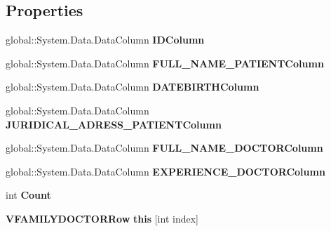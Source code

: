 \subsection*{Properties}
\begin{CompactItemize}
\item 
global::System.Data.DataColumn \textbf{IDColumn}\hspace{0.3cm}{\tt  [get]}\label{class_automatic_medical_system_1_1_data_set1_1_1_v_f_a_m_i_l_y_d_o_c_t_o_r_data_table_fc5576a060b3bf22802ffce4da0617c3}

\item 
global::System.Data.DataColumn \textbf{FULL\_\-NAME\_\-PATIENTColumn}\hspace{0.3cm}{\tt  [get]}\label{class_automatic_medical_system_1_1_data_set1_1_1_v_f_a_m_i_l_y_d_o_c_t_o_r_data_table_562c80571c9b0093932f308bca959298}

\item 
global::System.Data.DataColumn \textbf{DATEBIRTHColumn}\hspace{0.3cm}{\tt  [get]}\label{class_automatic_medical_system_1_1_data_set1_1_1_v_f_a_m_i_l_y_d_o_c_t_o_r_data_table_d2ca1ecfe462dd115a8959b508431de4}

\item 
global::System.Data.DataColumn \textbf{JURIDICAL\_\-ADRESS\_\-PATIENTColumn}\hspace{0.3cm}{\tt  [get]}\label{class_automatic_medical_system_1_1_data_set1_1_1_v_f_a_m_i_l_y_d_o_c_t_o_r_data_table_2ebad28baa533b7176bfff50dcc19cf3}

\item 
global::System.Data.DataColumn \textbf{FULL\_\-NAME\_\-DOCTORColumn}\hspace{0.3cm}{\tt  [get]}\label{class_automatic_medical_system_1_1_data_set1_1_1_v_f_a_m_i_l_y_d_o_c_t_o_r_data_table_d8678056b5612e3405f4f08bed782ac2}

\item 
global::System.Data.DataColumn \textbf{EXPERIENCE\_\-DOCTORColumn}\hspace{0.3cm}{\tt  [get]}\label{class_automatic_medical_system_1_1_data_set1_1_1_v_f_a_m_i_l_y_d_o_c_t_o_r_data_table_8f0d07a454f7ff7e6bc5aa3f3b057d41}

\item 
int \textbf{Count}\hspace{0.3cm}{\tt  [get]}\label{class_automatic_medical_system_1_1_data_set1_1_1_v_f_a_m_i_l_y_d_o_c_t_o_r_data_table_e4d706f64ebcd3fad79be4487e0a37a2}

\item 
{\bf VFAMILYDOCTORRow} \textbf{this} [int index]\hspace{0.3cm}{\tt  [get]}\label{class_automatic_medical_system_1_1_data_set1_1_1_v_f_a_m_i_l_y_d_o_c_t_o_r_data_table_d2fed39be0de95beede37cacf5934ee1}

\end{CompactItemize}
